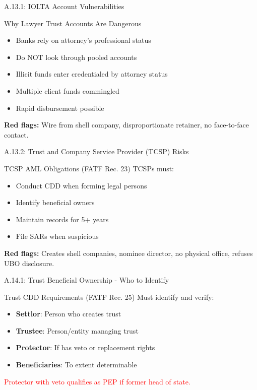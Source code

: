 \documentclass{beamer}
\begin{document}
	
	\begin{frame}{A.13.1: IOLTA Account Vulnerabilities}
		\begin{block}{Why Lawyer Trust Accounts Are Dangerous}
			\begin{itemize}
				\item Banks rely on attorney's professional status
				\item Do NOT look through pooled accounts
				\item Illicit funds enter credentialed by attorney status
				\item Multiple client funds commingled
				\item Rapid disbursement possible
			\end{itemize}
		\end{block}
		\textbf{Red flags:} Wire from shell company, disproportionate retainer, no face-to-face contact.
	\end{frame}
	
	\begin{frame}{A.13.2: Trust and Company Service Provider (TCSP) Risks}
		\begin{block}{TCSP AML Obligations (FATF Rec. 23)}
			TCSPs must:
			\begin{itemize}
				\item Conduct CDD when forming legal persons
				\item Identify beneficial owners
				\item Maintain records for 5+ years
				\item File SARs when suspicious
			\end{itemize}
		\end{block}
		\textbf{Red flags:} Creates shell companies, nominee director, no physical office, refuses UBO disclosure.
	\end{frame}
	
	
	\begin{frame}{A.14.1: Trust Beneficial Ownership - Who to Identify}
		\begin{block}{Trust CDD Requirements (FATF Rec. 25)}
			Must identify and verify:
			\begin{itemize}
				\item \textbf{Settlor}: Person who creates trust
				\item \textbf{Trustee}: Person/entity managing trust
				\item \textbf{Protector}: If has veto or replacement rights
				\item \textbf{Beneficiaries}: To extent determinable
			\end{itemize}
		\end{block}
		\textcolor{red}{Protector with veto qualifies as PEP if former head of state.}
	\end{frame}
	
\end{document}
